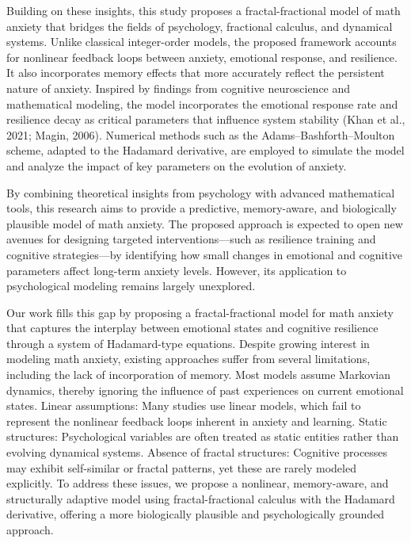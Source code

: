 \documentclass[10pt]{NSP1}
\begin{document}
Building on these insights, this study proposes a fractal-fractional model of math anxiety that bridges the fields of psychology, fractional calculus, and dynamical systems. Unlike classical integer-order models, the proposed framework accounts for nonlinear feedback loops between anxiety, emotional response, and resilience. It also incorporates memory effects that more accurately reflect the persistent nature of anxiety. Inspired by findings from cognitive neuroscience and mathematical modeling, the model incorporates the emotional response rate and resilience decay as critical parameters that influence system stability (Khan et al., 2021; Magin, 2006). Numerical methods such as the Adams–Bashforth–Moulton scheme, adapted to the Hadamard derivative, are employed to simulate the model and analyze the impact of key parameters on the evolution of anxiety.

By combining theoretical insights from psychology with advanced mathematical tools, this research aims to provide a predictive, memory-aware, and biologically plausible model of math anxiety. The proposed approach is expected to open new avenues for designing targeted interventions—such as resilience training and cognitive strategies—by identifying how small changes in emotional and cognitive parameters affect long-term anxiety levels. However, its application to psychological modeling remains largely unexplored.

Our work fills this gap by proposing a fractal-fractional model for math anxiety that captures the interplay between emotional states and cognitive resilience through a system of Hadamard-type equations. Despite growing interest in modeling math anxiety, existing approaches suffer from several limitations, including the lack of incorporation of memory. Most models assume Markovian dynamics, thereby ignoring the influence of past experiences on current emotional states. Linear assumptions: Many studies use linear models, which fail to represent the nonlinear feedback loops inherent in anxiety and learning. Static structures: Psychological variables are often treated as static entities rather than evolving dynamical systems. Absence of fractal structures: Cognitive processes may exhibit self-similar or fractal patterns, yet these are rarely modeled explicitly. To address these issues, we propose a nonlinear, memory-aware, and structurally adaptive model using fractal-fractional calculus with the Hadamard derivative, offering a more biologically plausible and psychologically grounded approach.
\end{document}
